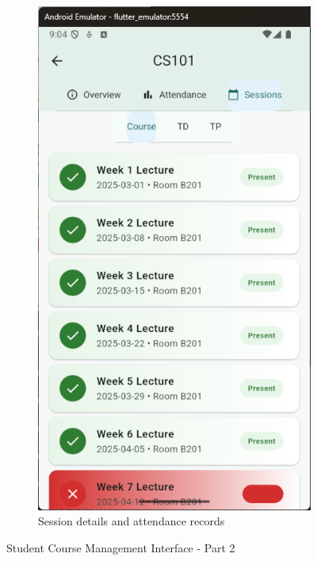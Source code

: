 \begin{figure}[H]
    \hfill
    \begin{subfigure}[b]{0.35\textwidth}
        \includegraphics[width=\textwidth]{images/rachid/student-side-courses-home-classSessions-4.png}
        \caption{Session details and attendance records}
    \end{subfigure}
    \caption{Student Course Management Interface - Part 2}
    \label{fig:student-courses-2}
\end{figure}

